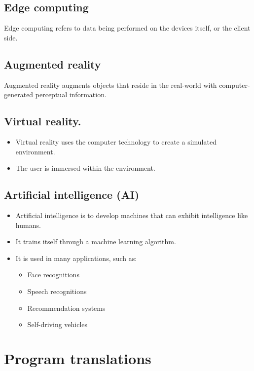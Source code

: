 \documentclass[11pt]{article}
\begin{document}
\subsection{Edge computing}
\label{sec:org4f765bc}
Edge computing refers to data being performed on the devices itself, or the client side.

\subsection{Augmented reality}
\label{sec:orgd5c4412}
Augmented reality augments objects that reside in the real-world with computer-generated perceptual information.

\subsection{Virtual reality.}
\label{sec:org512f8cb}
\begin{itemize}
\item Virtual reality uses the computer technology to create a simulated environment.
\item The user is immersed within the environment.
\end{itemize}

\subsection{Artificial intelligence (AI)}
\label{sec:orgc0fc010}
\begin{itemize}
\item Artificial intelligence is to develop machines that can exhibit intelligence like humans.
\item It trains itself through a machine learning algorithm.
\item It is used in many applications, such as:
\begin{itemize}
\item Face recognitions
\item Speech recognitions
\item Recommendation systems
\item Self-driving vehicles
\end{itemize}
\end{itemize}


 \newpage

\section{Program translations}
\label{sec:orgbf686e9}
\end{document}
